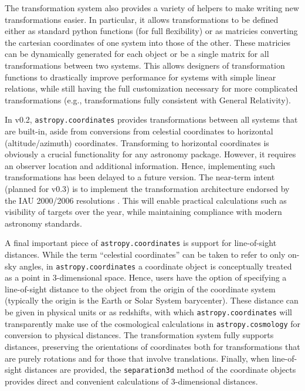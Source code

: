 \documentclass[traditabstract]{aa}
\begin{document}
The transformation system also provides a variety of helpers to make writing
new transformations easier.  In particular, it allows transformations to be
defined either as standard python functions (for full flexibility) or as
matricies converting the cartesian coordinates of one system into those of the
other.  These matricies can be dynamically generated for each object or be a
single matrix for all transformations between two systems.  This allows
designers of transformation functions to drastically improve performance for
systems with simple linear relations, while still having the full
customization necessary for more complicated transformations (e.g.,
transformations fully consistent with General Relativity).

In v0.2, \texttt{astropy.coordinates} provides transformations between all
systems that are built-in, aside from conversions from celestial coordinates to
horizontal (altitude/azimuth) coordinates.  Transforming to horizontal
coordinates is obviously a crucial functionality for any astronomy package.
However, it requires an observer location and additional information.  Hence,
implementing such transformations has been delayed to a
future version.  The near-term intent (planned for v0.3) is to implement the
transformation architecture endorsed by the IAU 2000/2006 resolutions
\citep[see e.g.,][]{soffel03, usnocircular179}.  This will enable practical
calculations such as visibility of targets over the year, while maintaining
compliance with modern astronomy standards.



A final important piece of \texttt{astropy.coordinates} is support for
line-of-sight distances.  While the term ``celestial coordinates'' can be
taken to refer to only on-sky angles, in \texttt{astropy.coordinates} a
coordinate object is conceptually treated as a point in 3-dimensional space.
Hence, users have the option of specifying a line-of-sight distance to the
object from the origin of the coordinate system (typically the origin is the
Earth or Solar System barycenter).  These distance can be given in physical
units or as redshifts, with which \texttt{astropy.coordinates} will transparently
make use of the cosmological calculations in \texttt{astropy.cosmology} for
conversion to physical distances.
The transformation system fully supports distances, preserving
the orientations of coordinates both for transformations that are purely
rotations and for those that involve translations.  Finally, when
line-of-sight distances are provided, the \texttt{separation3d} method of the
coordinate objects provides direct and convenient calculations of
3-dimensional distances.
\end{document}
